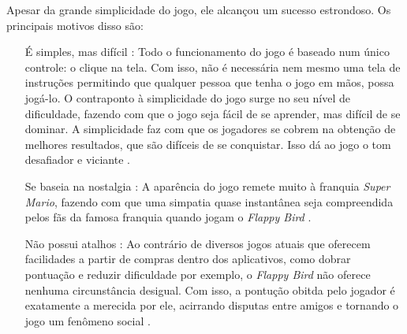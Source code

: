 Apesar da grande simplicidade do jogo, ele alcançou um sucesso estrondoso. Os principais motivos disso são:

\begin{itemize}
\item[É simples, mas difícil]: Todo o funcionamento do jogo é baseado num único controle: o clique na tela. Com isso, não é necessária nem mesmo uma tela de instruções permitindo que qualquer pessoa que tenha o jogo em mãos, possa jogá-lo. O contraponto à simplicidade do jogo surge no seu nível de dificuldade, fazendo com que o jogo seja fácil de se aprender, mas difícil de se dominar. A simplicidade faz com que os jogadores se cobrem na obtenção de melhores resultados, que são difíceis de se conquistar. Isso dá ao jogo o tom desafiador e viciante \cite{Dino2014}.

\item[Se baseia na nostalgia]: A aparência do jogo remete muito à franquia \textit{Super Mario}, fazendo com que uma simpatia quase instantânea seja compreendida pelos fãs da famosa franquia quando jogam o \textit{Flappy Bird} \cite{Dino2014}.

\item[Não possui atalhos]: Ao contrário de diversos jogos atuais que oferecem facilidades a partir de compras dentro dos aplicativos, como dobrar pontuação e reduzir dificuldade por exemplo, o \textit{Flappy Bird} não oferece nenhuma circunstância desigual. Com isso, a pontução obitda pelo jogador é exatamente a merecida por ele, acirrando disputas entre amigos e tornando o jogo um fenômeno social \cite{Dino2014}.

\end{itemize}





